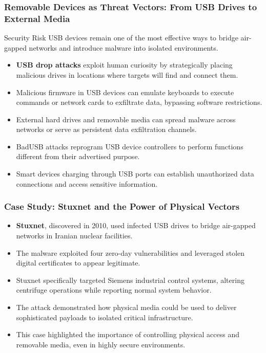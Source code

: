 \documentclass{beamer}
\begin{document}
\begin{frame}
    \frametitle{Removable Devices as Threat Vectors: From USB Drives to External Media}
    
    \begin{alertblock}{Security Risk}
        USB devices remain one of the most effective ways to bridge air-gapped networks and introduce malware into isolated environments.
    \end{alertblock}
    
    \begin{itemize}
        \item \textbf{USB drop attacks} exploit human curiosity by strategically placing malicious drives in locations where targets will find and connect them.
        \item Malicious firmware in USB devices can emulate keyboards to execute commands or network cards to exfiltrate data, bypassing software restrictions.
        \item External hard drives and removable media can spread malware across networks or serve as persistent data exfiltration channels.
        \item BadUSB attacks reprogram USB device controllers to perform functions different from their advertised purpose.
        \item Smart devices charging through USB ports can establish unauthorized data connections and access sensitive information.
    \end{itemize}
\end{frame}

\begin{frame}
    \frametitle{Case Study: Stuxnet and the Power of Physical Vectors}
    
    \begin{itemize}
        \item \textbf{Stuxnet}, discovered in 2010, used infected USB drives to bridge air-gapped networks in Iranian nuclear facilities.
        \item The malware exploited four zero-day vulnerabilities and leveraged stolen digital certificates to appear legitimate.
        \item Stuxnet specifically targeted Siemens industrial control systems, altering centrifuge operations while reporting normal system behavior.
        \item The attack demonstrated how physical media could be used to deliver sophisticated payloads to isolated critical infrastructure.
        \item This case highlighted the importance of controlling physical access and removable media, even in highly secure environments.
    \end{itemize}
\end{frame}
\end{document}
